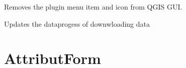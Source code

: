 \documentclass[letterpaper,10pt,english]{sphinxmanual}
\begin{document}
\begin{fulllineitems}

\begin{fulllineitems}
\label{\detokenize{code:Tilgjengelighet.Tilgjengelighet.unload}}
Removes the plugin menu item and icon from QGIS GUI.

\end{fulllineitems}


\begin{fulllineitems}
\label{\detokenize{code:Tilgjengelighet.Tilgjengelighet.updateDataReadProgress}}
Updates the dataprogess of downwloading data

\end{fulllineitems}


\end{fulllineitems}



\section{AttributForm}
\label{\detokenize{code:attributform}}
\end{document}
